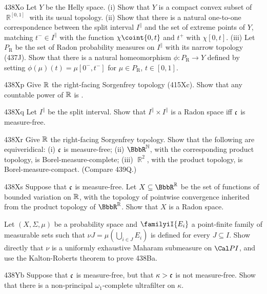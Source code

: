 {\spheader 438Xo Let $Y$ be the Helly space.  (i) Show that $Y$ is a compact convex subset of $\BbbR^{[0,1]}$ with its usual topology.   (ii) Show that there is
a natural one-to-one correspondence between the split interval $I^{\|}$ and the set of extreme points of $Y$, matching $t^-\in I^{\|}$ with the function
$\chi\coint{0,t}$ and $t^+$ with $\chi[0,t]$.
(iii) Let $P_{\text{R}}$ be the set of Radon probability measures on
$I^{\|}$ with its narrow topology (437J).   Show that
there is a natural homeomorphism $\phi:P_{\text{R}}\to Y$
defined by setting $\phi(\mu)(t)=\mu[0^-,t^-]$ for
$\mu\in P_{\text{R}}$, $t\in[0,1]$.

\spheader 438Xp Give $\Bbb R$ the right-facing Sorgenfrey topology
(415Xc).   Show that any countable power of $\Bbb R$ is \hwtr.

\sqheader 438Xq Let $I^{\|}$ be the split interval.   Show that
$I^{\|}\times I^{\|}$ is a Radon space iff $\frak c$ is measure-free.

\spheader 438Xr Give
$\Bbb R$ the right-facing Sorgenfrey topology.   Show that the
following are equiveridical:  (i) $\frak c$ is measure-free;  (ii)
$\BbbR^{\Bbb N}$, with the corresponding product topology, is
Borel-measure-complete;  (iii) $\BbbR^2$, with the product topology, is
Borel-measure-compact.   (Compare 439Q.)

\spheader 438Xs Suppose that $\frak c$ is measure-free.   Let
$X\subseteq\BbbR^{\Bbb R}$ be the set of functions of bounded variation
on $\Bbb R$, with the topology of pointwise convergence inherited from
the product
topology of $\BbbR^{\Bbb R}$.   Show that $X$ is a Radon space.

Let $(X,\Sigma,\mu)$ be a probability space and $\familyiI{E_i}$ a
point-finite family of measurable sets such that
$\nu J=\mu(\bigcup_{i\in J}E_i)$ is defined for every $J\subseteq I$.
Show directly that $\nu$ is a uniformly exhaustive Maharam submeasure on
$\Cal PI$, and use the Kalton-Roberts theorem to prove 438Ba.

\spheader 438Yb Suppose that $\frak c$ is measure-free, but that
$\kappa>\frak c$ is not measure-free.   Show that there is a
non-principal $\omega_1$-complete ultrafilter on $\kappa$.   

}

